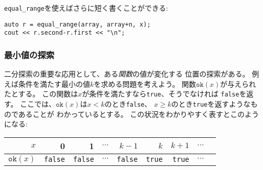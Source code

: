 \texttt{equal\_range}を使えばさらに短く書くことができる:

\begin{lstlisting}
auto r = equal_range(array, array+n, x);
cout << r.second-r.first << "\n";
\end{lstlisting}


\begin{comment}
\subsubsection{Finding the smallest solution}

An important use for binary search is
to find the position where the value of a \emph{function} changes.
Suppose that we wish to find the smallest value $k$
that is a valid solution for a problem.
We are given a function $\texttt{ok}(x)$
that returns \texttt{true} if $x$ is a valid solution
and \texttt{false} otherwise.
In addition, we know that $\texttt{ok}(x)$ is \texttt{false}
when $x<k$ and \texttt{true} when $x \ge k$.
The situation looks as follows:
\end{comment}

\subsubsection{最小値の探索}

二分探索の重要な応用として、ある\emph{関数}の値が変化する
位置の探索がある。
例えば条件を満たす最小の値$k$を求める問題を考えよう。
関数$\texttt{ok}(x)$が与えられたとする。
この関数は$x$が条件を満たすなら\texttt{true}、そうでなければ
\texttt{false}を返す。
ここでは、$\texttt{ok}(x)$は$x<k$のとき\texttt{false}、
$x \ge k$のとき\texttt{true}を返すようなものであることが
わかっているとする。
この状況をわかりやすく表すとこのようになる:

\begin{center}
\begin{tabular}{r|rrrrrrrr}
$x$ & 0 & 1 & $\cdots$ & $k-1$ & $k$ & $k+1$ & $\cdots$ \\
\hline
$\texttt{ok}(x)$ & \texttt{false} & \texttt{false}
& $\cdots$ & \texttt{false} & \texttt{true} & \texttt{true} & $\cdots$ \\
\end{tabular}
\end{center}

\noindent
\begin{comment}
Now, the value of $k$ can be found using binary search:
\end{comment}

